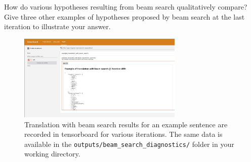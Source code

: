 \begin{parts}
\begin{subparts}
        
        \subpart[2] How do various hypotheses resulting from beam search qualitatively compare? Give three other examples of hypotheses proposed by beam search at the last iteration to illustrate your answer.

        
    \end{subparts}



    \begin{figure}
        \centering
        \includegraphics[width=0.7\textwidth]{images/example_translation_beam.jpg}
        \caption{Translation with beam search results for an example sentence are recorded in tensorboard for various iterations. The same data is available in the \texttt{outputs/beam\_search\_diagnostics/} folder in your working directory.}
        \label{fig:beam-search-diagnostics-tensorboard}
    \end{figure}
    

\end{parts}
